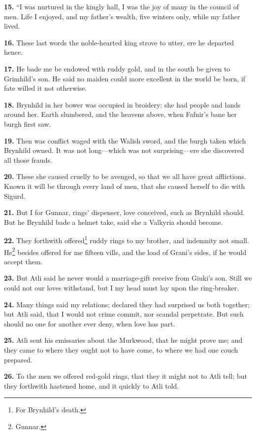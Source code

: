 \textbf{15.} ``I was nurtured in the kingly hall, I was the joy of many in the
council of men. Life I enjoyed, and my father's wealth, five winters
only, while my father lived.

\textbf{16.} These last words the noble-hearted king strove to utter, ere he
departed hence.

\textbf{17.} He bade me be endowed with ruddy gold, and in the south be given
to Grimhild's son. He said no maiden could more excellent in the world
be born, if fate willed it not otherwise.

\textbf{18.} Brynhild in her bower was occupied in broidery: she had people
and lands around her. Earth slumbered, and the heavens above, when
Fafnir's bane her burgh first saw.

\textbf{19.} Then was conflict waged with the Walish sword, and the burgh
taken which Brynhild owned. It was not long—which was not
surprising—ere she discovered all those frauds.

\textbf{20.} These she caused cruelly to be avenged, so that we all have
great afflictions. Known it will be through every land of men, that
she caused herself to die with Sigurd.

\textbf{21.} But I for Gunnar, rings' dispenser, love conceived, such as
Brynhild should. But he Brynhild bade a helmet take, said she a
Valkyria should become.

\textbf{22.} They forthwith offered\footnote{For Brynhild's death.} ruddy rings to my brother, and
indemnity not small. He\footnote{Gunnar.} besides offered for me fifteen vills, and
the load of Grani's sides, if he would accept them.

\textbf{23.} But Atli said he never would a marriage-gift receive from
Giuki's son. Still we could not our loves withstand, but I my head
must lay upon the ring-breaker.

\textbf{24.} Many things said my relations; declared they had surprised us
both together; but Atli said, that I would not crime commit, nor
scandal perpetrate. But such should no one for another ever deny, when
love has part.

\textbf{25.} Atli sent his emissaries about the Murkwood, that he might prove
me; and they came to where they ought not to have come, to where we
had one couch prepared.

\textbf{26.} To the men we offered red-gold rings, that they it might not to
Atli tell; but they forthwith hastened home, and it quickly to Atli
told.

